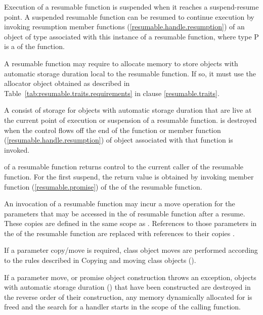 \pnum
Execution of a resumable function is suspended when it reaches a suspend-resume point.
A suspended resumable function can be resumed
to continue execution by invoking
resumption member functions (\ref{resumable.handle.resumption}) of an object of  type
associated with this instance of a resumable function, where type P
is a  of the function. 

\pnum
A resumable function may require to allocate
memory to store objects with automatic storage duration
local to the resumable function. If so, it must
use the allocator object obtained as described in 
Table~\ref{tab:resumable.traits.requirements} in clause \ref{resumable.traits}.

\pnum
A  consist of 
storage for objects with automatic storage duration
that are live at the current point of execution or suspension of 
a resumable function.
 is destroyed when
the control flows off the end of the function or
 member function (\ref{resumable.handle.resumption}) of  object associated with that function is invoked.

\pnum 
{} of a resumable function returns control to the current
caller of the resumable function. For the first suspend, the return value is obtained by invoking member function 
 (\ref{resumable.promise})
of the  of the resumable function.

\pnum
An invocation of a resumable function may incur a move operation for the parameters that may be accessed in the 
of resumable function after a resume. These copies
are defined in the same scope as . 
References to those parameters in the 
of the resumable function are replaced with 
references to their copies .

\pnum
If a parameter copy/move is required, class object moves are performed according to the rules described in Copying and moving class objects ().

\pnum
If a parameter move,  or promise object construction throws
an exception, objects with automatic storage duration () that have been
constructed are destroyed in the reverse order of their construction, any memory dynamically allocated 
for  is freed
and the search for a handler starts in the scope of the calling function. 

%
